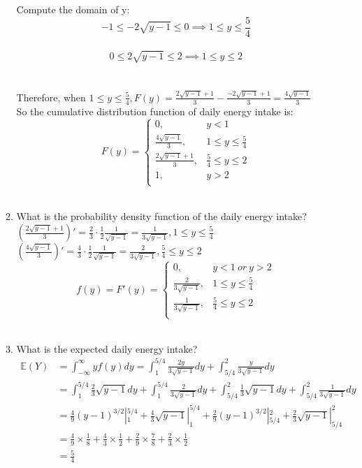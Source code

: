 \documentclass[11pt]{article}
\begin{document}
\begin{enumerate}[label=\textbf{Question \arabic*:},start=1]
\begin{enumerate}
	Compute the domain of y:\\
	$$ -1 \leq -2\sqrt{y-1} \leq 0 \implies 1 \leq y \leq \frac{5}{4} $$ \\
	$$ 0 \leq 2 \sqrt{y-1} \leq 2  \implies 1 \leq y \leq 2$$ \\
	\\
	Therefore, when $1 \leq y \leq \frac{5}{4}, F(y) = \frac{2\sqrt{y-1}+1}{3} - \frac{-2\sqrt{y-1}+1}{3} = \frac{4\sqrt{y-1}}{3}$ \\
	So the cumulative distribution function of daily energy intake is:\\
	$$F(y) = \begin{cases}
		0, & y < 1 \\
		\frac{4 \sqrt{y-1}}{3}, & 1 \leq y \le \frac{5}{4} \\
		\frac{ 2\sqrt{y-1} + 1}{3}, & \frac{5}{4} \le y \leq 2\\
		1, & y > 2 \\
		\end{cases}$$\\
	
	\item What is the probability density function of the daily energy intake?\\
	$(\frac{ 2\sqrt{y-1} + 1}{3})' = \frac{2}{3} \cdot \frac{1}{2} \frac{1}{\sqrt{y-1}}= \frac{1}{ 3\sqrt{y-1}}, 1 \leq y \le \frac{5}{4}$ \\
	$(\frac{4 \sqrt{y-1}}{3})' = \frac{4}{3} \cdot \frac{1}{2} \frac{1}{\sqrt{y-1}} = \frac{2}{3 \sqrt{y-1}}, \frac{5}{4} \le y \leq 2$ \\
	$$f(y) = F'(y) = \begin{cases}
		0, & y < 1\ or\ y > 2\\
		\frac{2}{3 \sqrt{y-1}}, & 1 \leq y \le \frac{5}{4} \\
		\frac{1}{ 3\sqrt{y-1}}, & \frac{5}{4} \le y \leq 2\\
		\end{cases}$$\\

	\item What is the expected daily energy intake?\\
	\begin{align*}
	\mathbb{E}(Y) & = \int_{-\infty}^{\infty} y f(y) dy = \int_{1}^{5/4} \frac{2y}{3\sqrt{y-1}} dy+ \int_{5/4}^{2} \frac{y}{3\sqrt{y-1}} dy\\
	 & = \int_{1}^{5/4} \frac{2}{3} \sqrt{y-1}dy + \int_{1}^{5/4} \frac{2}{3\sqrt{y-1}}dy + \int_{5/4}^{2} \frac{1}{3} \sqrt{y-1}dy + \int_{5/4}^{2} \frac{1}{3\sqrt{y-1}} dy \\
	 & = \frac{4}{9} (y-1)^{3/2} |_{1}^{5/4} + \frac{4}{3} \sqrt{y-1} |_{1}^{5/4} + \frac{2}{9} (y-1)^{3/2} |_{5/4}^{2} + \frac{2}{3} \sqrt{y-1} |_{5/4}^{2}  \\
	 & = \frac{4}{9} \times \frac{1}{8} + \frac{4}{3} \times \frac{1}{2} + \frac{2}{9} \times \frac{7}{8}  + \frac{2}{3} \times \frac{1}{2} \\
	 &= \frac{5}{4}
	\end{align*}
	

\end{enumerate}
\end{enumerate}
\end{document}
